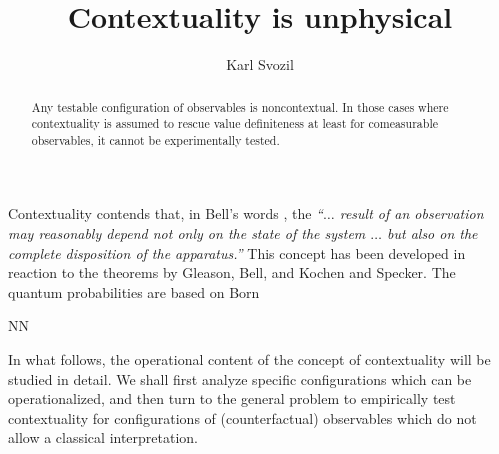 \documentclass[prl,twocolumn,showpacs,showkeys,amsfonts]{revtex4}
\begin{document}
\title{Contextuality is unphysical}

\author{Karl Svozil}


\begin{abstract}
Any testable configuration of observables is noncontextual.
In those cases where contextuality is assumed
to rescue value definiteness at least for comeasurable observables,
it cannot be experimentally tested.
\end{abstract}



\maketitle



Contextuality \cite{bohr-1949,bell-66,hey-red,redhead} contends that,
in Bell's words \cite[Sect. 5]{bell-66}, the {\em ``$\ldots$
result of an observation may reasonably depend
not only on the state of the system  $\ldots$
but also on the complete disposition  of the apparatus.''}
This concept has been developed in reaction to the theorems by
Gleason, Bell, and Kochen and Specker.
The quantum probabilities are based on Born


NN


In what follows, the operational content of the concept of contextuality will be studied
in detail.
We shall first analyze specific configurations which can be operationalized,
and then turn to the general problem to empirically test contextuality
for configurations of (counterfactual) observables
which do not allow a classical interpretation.



\end{document}
